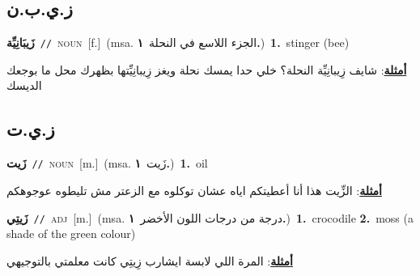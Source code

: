 \documentclass[10pt,a4paper,twoside]{article} %
\begin{document}
\begin{multicols}{2}
\vspace{-3mm}
\subsection*{\color{blue}\foreignlanguage{arabic}{ز.ي.ب.ن}\color{blue}{ (ntws)}} 

{\setlength\topsep{0pt}\textbf{\foreignlanguage{arabic}{زَيبَانِيِّة}}\ {\color{gray}\texttt{//}\color{black}}\ \textsc{noun}\ [f.]\ \color{gray}(msa. \foreignlanguage{arabic}{الجزء اللاسع في النحلة}~\foreignlanguage{arabic}{\textbf{١.}})\color{black}\ \textbf{1.}~stinger (bee)\  \begin{flushright}\color{gray}\foreignlanguage{arabic}{\textbf{\underline{\foreignlanguage{arabic}{أمثلة}}}: شايف زِيبانِيِّة النحلة؟ خلي حدا يمسك نحلة ويغز زِيبانِيِّتها  بظهرك محل ما بوجعك الديسك}\end{flushright}\color{black}} \vspace{2mm}

\vspace{-3mm}
\subsection*{\color{blue}\foreignlanguage{arabic}{ز.ي.ت}\color{blue}{}} 

{\setlength\topsep{0pt}\textbf{\foreignlanguage{arabic}{زَيت}}\ {\color{gray}\texttt{//}\color{black}}\ \textsc{noun}\ [m.]\ \color{gray}(msa. \foreignlanguage{arabic}{زَيت}~\foreignlanguage{arabic}{\textbf{١.}})\color{black}\ \textbf{1.}~oil\  \begin{flushright}\color{gray}\foreignlanguage{arabic}{\textbf{\underline{\foreignlanguage{arabic}{أمثلة}}}: الزِّيت هذا أنا أعطيتكم اياه عشان توكلوه مع الزعتر مش تليطوه عوجوهكم}\end{flushright}\color{black}} \vspace{2mm}

{\setlength\topsep{0pt}\textbf{\foreignlanguage{arabic}{زَيتِي}}\ {\color{gray}\texttt{//}\color{black}}\ \textsc{adj}\ [m.]\ \color{gray}(msa. \foreignlanguage{arabic}{درجة من درجات اللون الأخضر}~\foreignlanguage{arabic}{\textbf{١.}})\color{black}\ \textbf{1.}~crocodile  \textbf{2.}~moss (a shade of the green colour)\  \begin{flushright}\color{gray}\foreignlanguage{arabic}{\textbf{\underline{\foreignlanguage{arabic}{أمثلة}}}: المرة اللي لابسة ايشارب زِيتِي كانت معلمتي بالتوجيهي}\end{flushright}\color{black}} \vspace{2mm}


\end{multicols}
\end{document}
